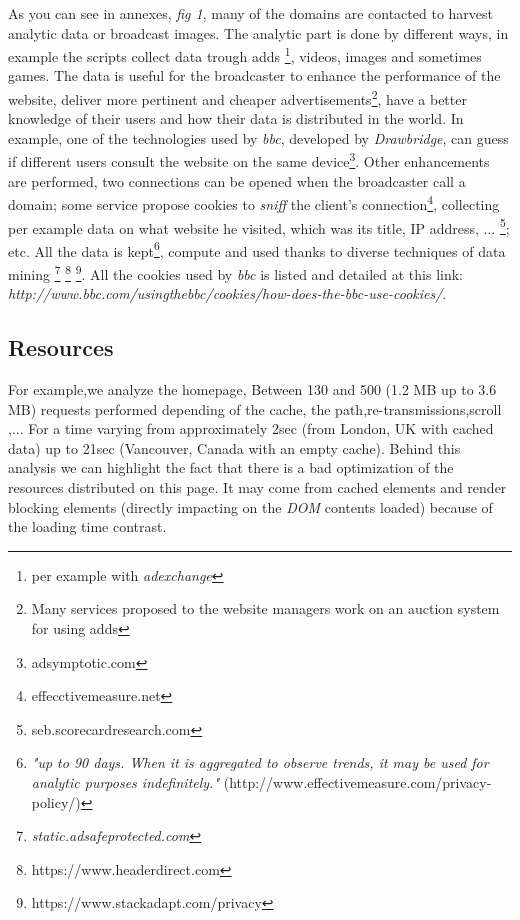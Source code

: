 \documentclass[conference]{IEEEtran}
\begin{document}
As you can see in annexes, \textit{fig 1}, many of the domains are contacted to harvest analytic data or broadcast images. The analytic part is done by different ways, in example the scripts collect data trough adds \footnote{per example with \textit{adexchange}}, videos, images and sometimes games. The data is useful for the broadcaster to enhance the performance of the website, deliver more pertinent and cheaper advertisements\footnote{Many services proposed to the website managers work on an auction system for using adds}, have a better knowledge of their users  and how their data is distributed in the world. In example, one of the technologies used by \textit{bbc}, developed by \textit{Drawbridge}, can guess if different users consult the website on the same device\footnote{adsymptotic.com}. Other enhancements are performed, two connections can be opened when the broadcaster call a domain; some service propose cookies to \textit{sniff} the client's connection\footnote{effecctivemeasure.net}, collecting per example data on what website he visited, which was its title, IP address, ... \footnote{seb.scorecardresearch.com}; etc. All the data is kept\footnote{\textit{"up to 90 days. When it is aggregated to observe trends, it may be used for analytic purposes indefinitely."} (http://www.effectivemeasure.com/privacy-policy/)}, compute and used thanks to diverse techniques of data mining \footnote{\textit{static.adsafeprotected.com}} \footnote{https://www.headerdirect.com} \footnote{https://www.stackadapt.com/privacy}. All the cookies used by \textit{bbc} is listed and detailed at this link: \textit{http://www.bbc.com/usingthebbc/cookies/how-does-the-bbc-use-cookies/}. 
 
 



\subsection{Resources}
For example,we analyze the homepage, 
Between 130 and 500 (1.2 MB up to 3.6 MB) requests performed depending of the cache, the path,re-transmissions,scroll ,... 
For a time varying from approximately 2sec (from London, UK with cached data) up to 21sec (Vancouver, Canada with an empty cache). 
Behind this analysis we can highlight the fact that there is a bad optimization of the resources distributed on this page. It may come from cached elements and render blocking elements (directly impacting on the \textit{DOM} contents loaded) because of the loading time contrast. 
\end{document}
